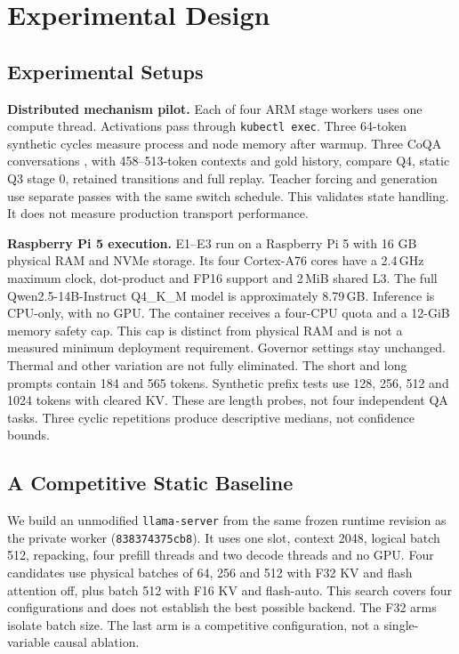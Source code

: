 \section{Experimental Design}
\label{sec:methods}
\subsection{Experimental Setups}
\textbf{Distributed mechanism pilot.} Each of four ARM stage workers uses one compute thread. Activations pass through \texttt{kubectl exec}. Three
64-token synthetic cycles measure process and node memory after warmup. Three CoQA
conversations \citep{coqa}, with 458--513-token contexts and gold history,
compare Q4, static Q3 stage 0, retained transitions and full replay. Teacher
forcing and generation use separate passes with the same switch schedule.
This validates state handling. It does not measure production transport performance.

\textbf{Raspberry Pi 5 execution.} E1--E3 run on a Raspberry Pi 5 with
16 GB physical RAM and NVMe storage. Its four Cortex-A76 cores have a
2.4\,GHz maximum clock, dot-product and FP16 support and 2\,MiB shared L3.
The full Qwen2.5-14B-Instruct Q4\_K\_M model is approximately 8.79\,GB.
Inference is CPU-only, with no GPU. The container receives a four-CPU quota
and a 12-GiB memory safety cap. This cap is distinct from physical RAM and
is not a measured minimum deployment requirement. Governor
settings stay unchanged. Thermal and other variation are not fully eliminated.
The short and long prompts contain 184 and 565 tokens. Synthetic prefix tests
use 128, 256, 512 and 1024 tokens with cleared KV. These are length probes,
not four independent QA tasks.
Three cyclic repetitions produce descriptive medians, not confidence bounds.

\subsection{A Competitive Static Baseline}
We build an unmodified \texttt{llama-server} from the same frozen runtime
revision as the private worker (\texttt{838374375cb8}). It uses one slot, context 2048, logical batch
512, repacking, four prefill threads and two decode threads and no GPU. Four candidates
use physical batches of 64, 256 and 512 with F32 KV and flash attention off, plus batch
512 with F16 KV and flash-auto. This search covers four configurations and does not establish the best
possible backend. The F32 arms isolate batch size. The last arm
is a competitive configuration, not a single-variable causal ablation.

